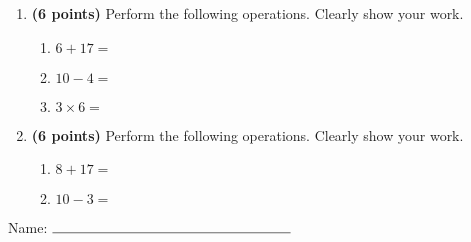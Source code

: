 \documentclass[12pt]{amsart}
\begin{document}
\newpage
\begin{enumerate}
\item {\bf (6 points)} 
 Perform the following operations. Clearly show your work. \begin{enumerate}


\def \a{6}\def \b{17}\def \apb{23}

 
\item $\a + \b = $

\vspace{2cm}
\def \a{10}\def \dif{6}\def \b{4}

 
\item $\a - \b = $

\vspace{2cm}
\def \a{3}\def \b{6}\def \ab{9}

 
\item $\a \times \b = $ 

\vspace{2cm}
\def \vshift{1}\def \hshift{-4}\def \chang{0}\def \findval{-4}\def \yval{1}

 
\end{enumerate}


\newpage
\item {\bf (6 points)} 
 Perform the following operations. Clearly show your work. \begin{enumerate}


\def \a{8}\def \b{17}\def \apb{25}

 
\item $\a + \b = $

\vspace{2cm}
\def \a{10}\def \dif{7}\def \b{3}

 
\item $\a - \b = $

\vspace{2cm}
\def \vshift{5}\def \hshift{4}\def \chang{0}\def \findval{4}\def \yval{5}

 
\end{enumerate}


\newpage\end{enumerate}\graphicspath{{C:/Users/iainc/anaconda3/Randomizer/Sample Course/Sample Assessment 2/}}\setcounter{page}{1}


\thispagestyle{fancy}

 
\noindent Name: $\rule{6cm}{0.15mm}$

\vspace{.2cm}
\end{document}
